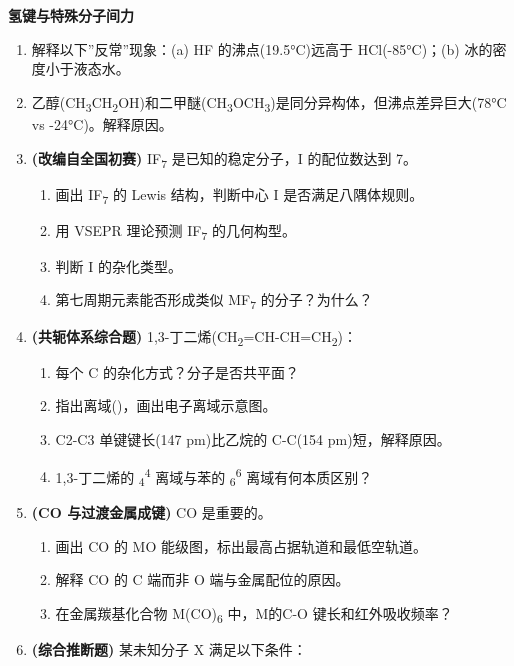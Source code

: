 \textbf{氢键与特殊分子间力}

\begin{enumerate}
\def\labelenumi{\arabic{enumi}.}
\setcounter{enumi}{20}
\item
  解释以下''反常''现象：(a) HF 的沸点(19.5°C)远高于 HCl(-85°C)；(b) 冰的密度小于液态水。
\item
  乙醇(CH\textsubscript{3}CH\textsubscript{2}OH)和二甲醚(CH\textsubscript{3}OCH\textsubscript{3})是同分异构体，但沸点差异巨大(78°C vs -24°C)。解释原因。
\item
  \textbf{(改编自全国初赛)} IF\textsubscript{7} 是已知的稳定分子，I 的配位数达到 7。

  \begin{enumerate}
  \def\labelenumii{(\alph{enumii})}
  \tightlist
  \item
    画出 IF\textsubscript{7} 的 Lewis 结构，判断中心 I 是否满足八隅体规则。
  \item
    用 VSEPR 理论预测 IF\textsubscript{7} 的几何构型。
  \item
    判断 I 的杂化类型。
  \item
    第七周期元素能否形成类似 MF\textsubscript{7} 的分子？为什么？
  \end{enumerate}
\item
  \textbf{(共轭体系综合题)} 1,3-丁二烯(CH\textsubscript{2}=CH-CH=CH\textsubscript{2})：

  \begin{enumerate}
  \def\labelenumii{(\alph{enumii})}
  \tightlist
  \item
    每个 C 的杂化方式？分子是否共平面？
  \item
    指出离域()，画出电子离域示意图。
  \item
    C2-C3 单键键长(147 pm)比乙烷的 C-C(154 pm)短，解释原因。
  \item
    1,3-丁二烯的 \派\textsubscript{4}\textsuperscript{4} 离域与苯的 \派\textsubscript{6}\textsuperscript{6} 离域有何本质区别？
  \end{enumerate}
\item
  \textbf{(CO 与过渡金属成键)} CO 是重要的。

  \begin{enumerate}
  \def\labelenumii{(\alph{enumii})}
  \tightlist
  \item
    画出 CO 的 MO 能级图，标出最高占据轨道和最低空轨道。
  \item
    解释 CO 的 C 端而非 O 端与金属配位的原因。
  \item
    在金属羰基化合物 M(CO)\textsubscript{6} 中，M 的 C-O 键长和红外吸收频率？
  \end{enumerate}
\item
  \textbf{(综合推断题)} 某未知分子 X 满足以下条件：


\end{enumerate}
